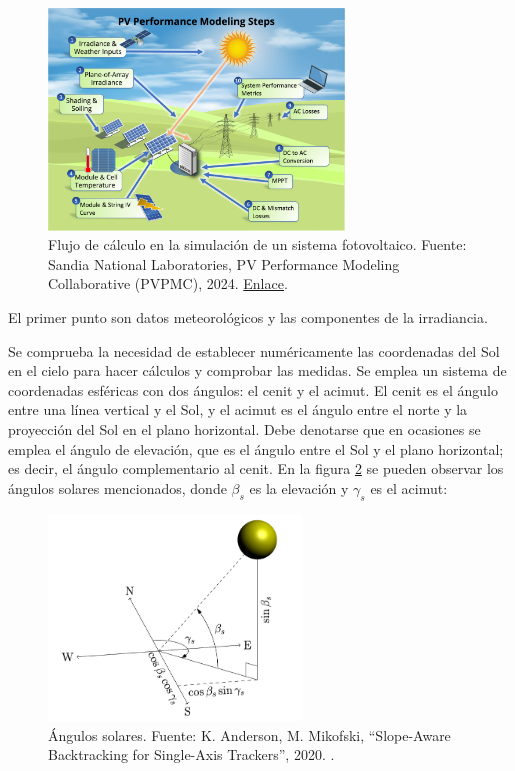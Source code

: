 \begin{figure}[H]
      \centering
      \includegraphics[width=0.7\textwidth]{./images/SoA_irrad/pv_simulation_flow.png}
      \caption{Flujo de cálculo en la simulación de un sistema fotovoltaico. Fuente: Sandia National Laboratories, PV Performance Modeling Collaborative (PVPMC), 2024. \href{https://pvpmc.sandia.gov/}{Enlace}.}
      \label{fig:pv_simulation_flow}
\end{figure}

El primer punto son datos meteorológicos y las componentes de la irradiancia.

Se comprueba la necesidad de establecer numéricamente las coordenadas del Sol en el cielo para hacer cálculos y comprobar las medidas. Se emplea un sistema de \gls{coordenadas esféricas} con dos ángulos: el \gls{cenit} y el \gls{acimut}. El cenit es el ángulo entre una línea vertical y el Sol, y el acimut es el ángulo entre el norte y la proyección del Sol en el plano horizontal. Debe denotarse que en ocasiones se emplea el \gls{ángulo de elevación}, que es el ángulo entre el Sol y el plano horizontal; es decir, el ángulo complementario al cenit. En la figura \ref{fig:solar_angles} se pueden observar los ángulos solares mencionados, donde $\beta_s$ es la elevación y $\gamma_s$ es el acimut:

\begin{figure}[h]
      \centering
      \includegraphics[width=0.6\textwidth]{./images/SoA_irrad/Anderson_Mikofski_Fig2.png}
      \caption{Ángulos solares. Fuente: K. Anderson, M. Mikofski, ``Slope-Aware Backtracking for Single-Axis Trackers'', 2020. \cite[Fig. 2]{Anderson_Mikofski_2020}.}
      \label{fig:solar_angles}
\end{figure}

